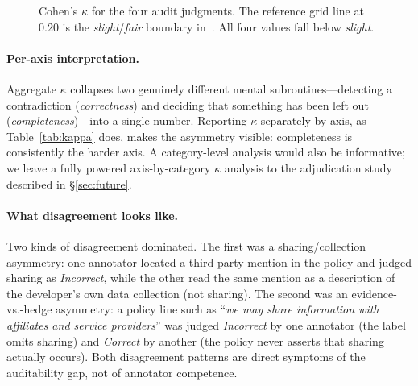 \documentclass[11pt,a4paper]{article}
\begin{document}
\begin{figure}[t]
\centering
{}
\caption{Cohen's $\kappa$ for the four audit judgments. The reference
grid line at $0.20$ is the \emph{slight}/\emph{fair} boundary
in~\citet{landis1977measurement}. All four values fall below
\emph{slight}.}
\label{fig:kappa}
\end{figure}

\paragraph{Per-axis interpretation.}
Aggregate $\kappa$ collapses two genuinely different mental
subroutines---detecting a contradiction (\emph{correctness}) and
deciding that something has been left out (\emph{completeness})---into
a single number. Reporting $\kappa$ separately by axis, as
Table~\ref{tab:kappa} does, makes the asymmetry visible: completeness
is consistently the harder axis. A category-level analysis would also
be informative; we leave a fully powered axis-by-category $\kappa$
analysis to the adjudication study described in \S\ref{sec:future}.

\paragraph{What disagreement looks like.}
Two kinds of disagreement dominated. The first was a
sharing/collection asymmetry: one annotator located a third-party
mention in the policy and judged sharing as \emph{Incorrect}, while
the other read the same mention as a description of the developer's
own data collection (not sharing). The second was an evidence-vs.-hedge
asymmetry: a policy line such as ``\emph{we may share information
with affiliates and service providers}'' was judged \emph{Incorrect}
by one annotator (the label omits sharing) and \emph{Correct} by
another (the policy never asserts that sharing actually occurs). Both
disagreement patterns are direct symptoms of the auditability gap, not
of annotator competence.
\end{document}
